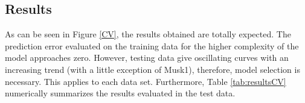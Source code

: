 \subsection{Results}
As can be seen in Figure \ref{CV}, the results obtained are totally expected. The prediction error evaluated on the training data for the higher complexity of the model approaches zero. However, testing data give oscillating curves with an increasing trend (with a little exception of Musk1), therefore, model selection is necessary. This applies to each data set.  Furthermore, Table \ref{tab:resultsCV} numerically summarizes the results evaluated in the test data. 

\begin{figure}[h]
	\centering
	\

\end{figure}
